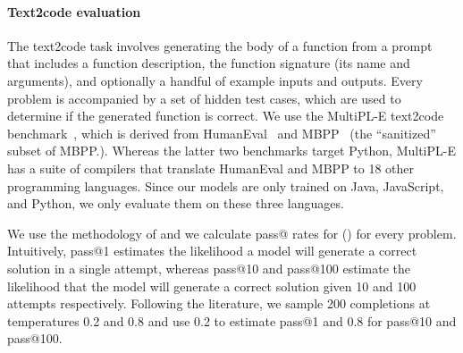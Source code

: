 \documentclass[10pt]{article} \usepackage{iclr2023_conference,times}
\begin{document}
\paragraph{Text2code evaluation}

The text2code task involves generating the body of a function from a prompt that includes a function description, the function signature (its name and arguments), and optionally a handful of example inputs and outputs.
Every problem is accompanied by a set of hidden test cases, which are used to determine if the generated function is correct.
We use the MultiPL-E text2code benchmark~\cite{cassano2022multiple}, which is derived from HumanEval~\cite{chen2021codex} and MBPP~\cite{austin2021program} (the ``sanitized'' subset of MBPP.). Whereas the latter two benchmarks target Python, MultiPL-E has a suite of compilers that translate HumanEval and MBPP to 18 other programming languages. Since our models are only trained on Java, JavaScript, and Python, we only evaluate them on these three languages.

We use the methodology of \citet{chen2021codex} and we calculate pass@ rates for () for every problem.
Intuitively, pass@1 estimates the likelihood a model will generate a correct solution in a single attempt, whereas pass@10 and pass@100 estimate the likelihood that the model will generate a correct solution given 10 and 100 attempts respectively.
Following the literature, we sample 200 completions at temperatures 0.2 and 0.8 and use 0.2 to estimate pass@1 and 0.8 for pass@10 and pass@100.
\end{document}

